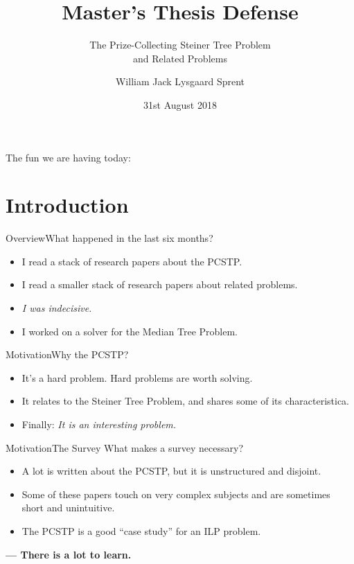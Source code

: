\documentclass[rgb,dvipsnames]{beamer}
\title{Master's Thesis Defense}
\subtitle{The Prize-Collecting Steiner Tree Problem
  \\and Related Problems}
\author{William Jack Lysgaard Sprent}
\date{31st August 2018}
\institute{DIKU}
\begin{document}
 
\frame{\titlepage}

\begin{frame}{The fun we are having today:}
\tableofcontents
\end{frame}

\section{Introduction}

\begin{frame}{Overview}{What happened in the last six months?}
  \pause
  \begin{itemize}
  \item I read a stack of research papers about the PCSTP. \pause
  \item I read a smaller stack of research papers about related problems. \pause
  \item \textit{I was indecisive.} \pause
  \item I worked on a solver for the Median Tree Problem.
  \end{itemize}
\end{frame}

\begin{frame}{Motivation}{Why the PCSTP?}
  \begin{itemize}
  \item It's a hard problem. Hard problems are worth solving.
  \item It relates to the Steiner Tree Problem, and shares some of
    its characteristica.
    \pause
  \item Finally: \textit{It is an interesting problem.}
  \end{itemize}
\end{frame}

\begin{frame}{Motivation}{The Survey}
  What makes a survey necessary?
  \pause
  \begin{itemize}
  \item A lot is written about the PCSTP, but it is unstructured and disjoint.
  \item Some of these papers touch on very complex subjects
    and are sometimes short and unintuitive.
  \item The PCSTP is a good ``case study'' for an ILP problem.
  \end{itemize}
  \pause
  \textbf{ --- There is a lot to learn.}
  
\end{frame}
\end{document}
